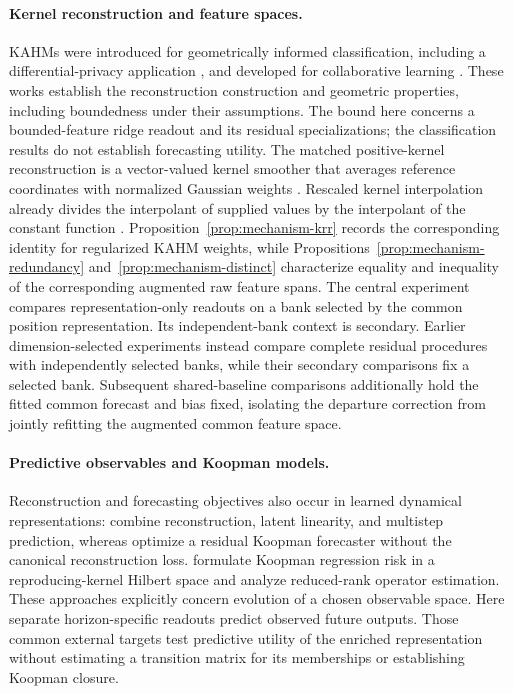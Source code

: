 \paragraph{Kernel reconstruction and feature spaces.}
KAHMs were introduced for geometrically informed classification,
including a differential-privacy application \citep{Kumar2024KAHM},
and developed for collaborative learning \citep{Kumar2025Collaborative}.
These works establish the reconstruction construction and geometric
properties, including boundedness under their assumptions. The bound
here concerns a bounded-feature ridge readout and its residual
specializations; the classification results do not establish forecasting
utility.
The matched positive-kernel reconstruction is a vector-valued kernel
smoother that averages reference coordinates with normalized Gaussian
weights \citep{Nadaraya1964Regression}. Rescaled kernel interpolation
already divides the interpolant of supplied values by the interpolant
of the constant function
\citep{Deparis2014Rescaled,DeMarchi2017Rescaled}.
Proposition~\ref{prop:mechanism-krr} records the corresponding identity
for regularized KAHM weights, while
Propositions~\ref{prop:mechanism-redundancy}
and~\ref{prop:mechanism-distinct} characterize equality and inequality of
the corresponding augmented raw feature spans.
The central experiment compares representation-only readouts on a bank
selected by the common position representation. Its independent-bank
context is secondary. Earlier dimension-selected experiments instead
compare complete residual procedures with independently selected banks,
while their secondary comparisons fix a selected bank. Subsequent
shared-baseline comparisons additionally hold the fitted common forecast
and bias fixed, isolating the departure correction from jointly refitting
the augmented common feature space.

\paragraph{Predictive observables and Koopman models.}
Reconstruction and forecasting objectives also occur in learned
dynamical representations:
\citet{Lusch2018Embeddings} combine reconstruction, latent linearity,
and multistep prediction, whereas \citet{Liu2023Koopa} optimize a
residual Koopman forecaster without the canonical reconstruction loss.
\citet{Kostic2022KoopmanRegression} formulate Koopman regression risk in
a reproducing-kernel Hilbert space and analyze reduced-rank operator
estimation. These approaches explicitly concern evolution of a chosen
observable space. Here separate horizon-specific readouts predict
observed future outputs. Those common external targets test predictive
utility of the enriched representation without estimating a transition
matrix for its memberships or establishing Koopman closure.


